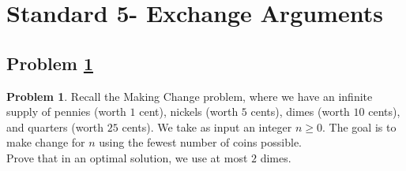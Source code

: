 \documentclass[11pt]{article}
\theoremstyle{definition}
\theoremstyle{definition}
\newtheorem{required}{Problem}
\theoremstyle{definition}
\begin{document}
\newpage
\section{Standard 5- Exchange Arguments}
\subsection{Problem \ref{Exchange1}}
\begin{required} \label{Exchange1}
Recall the Making Change problem, where we have an infinite supply of pennies (worth $1$ cent), nickels (worth $5$ cents), dimes (worth $10$ cents), and quarters (worth $25$ cents). We take as input an integer $n \geq 0$. The goal is to make change for $n$ using the fewest number of coins possible. \\

\noindent Prove that in an optimal solution, we use at most $2$ dimes. 
\end{required}
\end{document}
